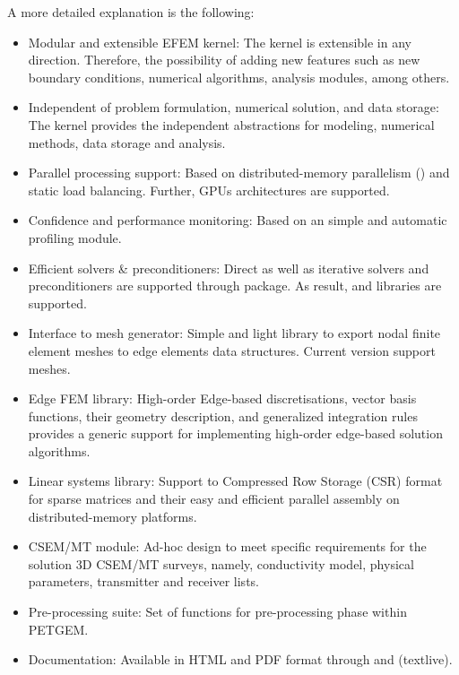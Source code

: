 \documentclass[letterpaper,10pt,english]{sphinxmanual}
\begin{document}
A more detailed explanation is the following:
\begin{itemize}
\item {} 
Modular and extensible EFEM kernel: The kernel is extensible in any direction. Therefore, the possibility of adding new features such as new boundary conditions, numerical algorithms, analysis modules, among others.

\item {} 
Independent of problem formulation, numerical solution, and data storage: The kernel provides the independent abstractions for modeling, numerical methods, data storage and analysis.

\item {} 
Parallel processing support: Based on distributed-memory parallelism () and static load balancing.  Further, GPUs architectures are supported.

\item {} 
Confidence and performance monitoring: Based on an simple and automatic profiling module.

\item {} 
Efficient solvers \& preconditioners: Direct as well as iterative solvers and preconditioners are supported through  package. As result,  and  libraries are supported.

\item {} 
Interface to mesh generator: Simple and light library to export nodal finite element meshes to edge elements data structures. Current version support  meshes.

\item {} 
Edge FEM library: High-order Edge-based discretisations, vector basis functions, their geometry description, and generalized integration rules provides a generic support for implementing high-order edge-based solution algorithms.

\item {} 
Linear systems library: Support to Compressed Row Storage (CSR) format for sparse matrices and their easy and efficient parallel assembly on distributed-memory platforms.

\item {} 
CSEM/MT module: Ad-hoc design to meet specific requirements for the solution 3D CSEM/MT surveys, namely, conductivity model, physical parameters, transmitter and receiver lists.

\item {} 
Pre-processing suite: Set of  functions for pre-processing phase within PETGEM.

\item {} 
Documentation: Available in HTML and PDF format through  and  (textlive).

\end{itemize}
\end{document}
